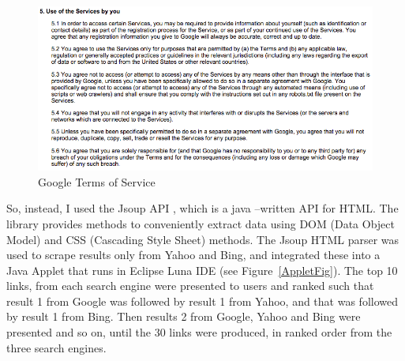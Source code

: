\documentclass[a4paper, 11pt]{article}
\begin{document}
\begin{figure}[H]
\begin{center}
\includegraphics[scale=0.6]{GoogleToS}
\caption{Google Terms of Service}
\label{GoogleToS1}

\end{center}
\end{figure}


So, instead, I used the Jsoup API \cite{jsoup}, which is a java –written API for HTML. The library provides methods to conveniently extract data using DOM (Data Object Model) and CSS (Cascading Style Sheet) methods. The Jsoup HTML parser was used to scrape results only from Yahoo and Bing, and integrated these into a Java Applet that runs in Eclipse Luna IDE (see Figure~\ref{AppletFig}). The top 10 links, from each search engine were presented to users and ranked such that result 1 from Google was followed by result 1 from Yahoo, and that was followed by result 1 from Bing. Then results 2 from Google, Yahoo and Bing were presented and so on, until the 30 links were produced, in ranked order from the three search engines. 
\end{document}
